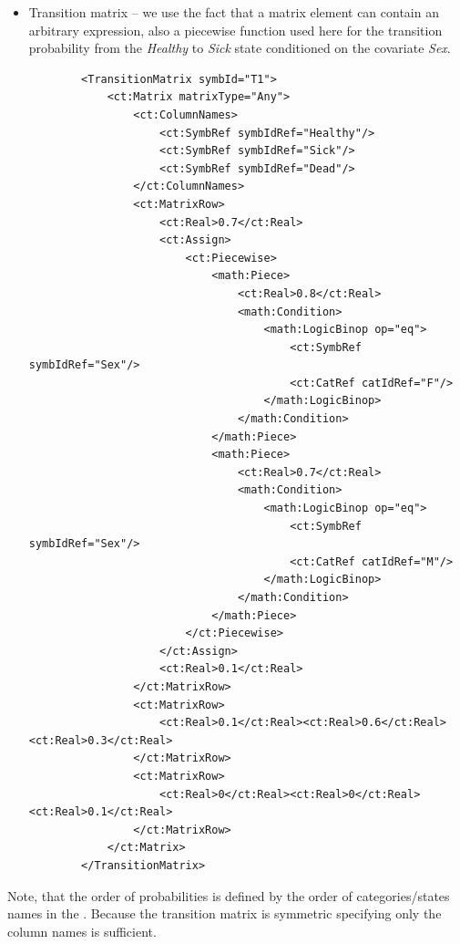 \begin{itemize}
\item
Transition matrix -- we use the fact that a matrix element can contain an arbitrary expression,
also a piecewise function used here for the transition probability from the \emph{Healthy} to 
\emph{Sick} state conditioned on the covariate \emph{Sex}. 
\lstset{language=XML}
\begin{lstlisting}
        <TransitionMatrix symbId="T1">
            <ct:Matrix matrixType="Any">
                <ct:ColumnNames>
                    <ct:SymbRef symbIdRef="Healthy"/>
                    <ct:SymbRef symbIdRef="Sick"/>
                    <ct:SymbRef symbIdRef="Dead"/>
                </ct:ColumnNames>
                <ct:MatrixRow>
                    <ct:Real>0.7</ct:Real>
                    <ct:Assign>
                        <ct:Piecewise>
                            <math:Piece>
                                <ct:Real>0.8</ct:Real>
                                <math:Condition>
                                    <math:LogicBinop op="eq">
                                        <ct:SymbRef symbIdRef="Sex"/>
                                        <ct:CatRef catIdRef="F"/>
                                    </math:LogicBinop>
                                </math:Condition>
                            </math:Piece>
                            <math:Piece>
                                <ct:Real>0.7</ct:Real>
                                <math:Condition>
                                    <math:LogicBinop op="eq">
                                        <ct:SymbRef symbIdRef="Sex"/>
                                        <ct:CatRef catIdRef="M"/>
                                    </math:LogicBinop>
                                </math:Condition>
                            </math:Piece>
                        </ct:Piecewise>
                    </ct:Assign>
                    <ct:Real>0.1</ct:Real>
                </ct:MatrixRow>
                <ct:MatrixRow>
                    <ct:Real>0.1</ct:Real><ct:Real>0.6</ct:Real><ct:Real>0.3</ct:Real>
                </ct:MatrixRow>
                <ct:MatrixRow>
                    <ct:Real>0</ct:Real><ct:Real>0</ct:Real><ct:Real>0.1</ct:Real>
                </ct:MatrixRow>
            </ct:Matrix>
        </TransitionMatrix>
\end{lstlisting}
\end{itemize}
Note, that the order of probabilities is defined by the order of categories/states names in the .
Because the transition matrix is symmetric specifying only the column names is sufficient. 


